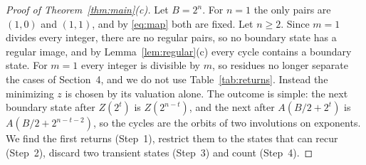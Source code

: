 \documentclass[11pt]{amsart}
\theoremstyle{definition}
\theoremstyle{remark}
\begin{document}
\begin{proof}[Proof of Theorem~\ref{thm:main}\textup{(c)}]
Let $B=2^n$. For $n=1$ the only pairs are $(1,0)$ and $(1,1)$, and by \eqref{eq:map} both are fixed. Let $n\ge2$. Since $m=1$ divides every integer, there are no regular pairs, so no boundary state has a regular image, and by Lemma~\ref{lem:regular}(c) every cycle contains a boundary state. For $m=1$ every integer is divisible by $m$, so residues no longer separate the cases of Section~4, and we do not use Table~\ref{tab:returns}. Instead the minimizing $z$ is chosen by its valuation alone. The outcome is simple: the next boundary state after $Z(2^t)$ is $Z(2^{n-t})$, and the next after $A(B/2+2^t)$ is $A(B/2+2^{n-t-2})$, so the cycles are the orbits of two involutions on exponents. We find the first returns (Step~1), restrict them to the states that can recur (Step~2), discard two transient states (Step~3) and count (Step~4).


\end{proof}
\end{document}
